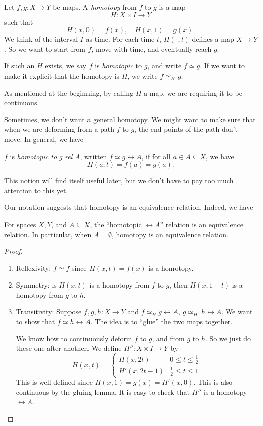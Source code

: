\documentclass[a4paper]{article}
\begin{document}
\begin{defi}[Homotopy]
  Let $f, g: X\to Y$ be maps. A \emph{homotopy} from $f$ to $g$ is a map
  \[
    H: X\times I \to Y
  \]
  such that
  \[
    H(x, 0) = f(x),\quad H(x, 1) = g(x).
  \]
  We think of the interval $I$ as time. For each time $t$, $H(\cdot, t)$ defines a map $X\to Y$. So we want to start from $f$, move with time, and eventually reach $g$.

  If such an $H$ exists, we say $f$ is \emph{homotopic} to $g$, and write $f\simeq g$. If we want to make it explicit that the homotopy is $H$, we write $f \simeq_H g$.
\end{defi}
As mentioned at the beginning, by calling $H$ a map, we are requiring it to be continuous.

Sometimes, we don't want a general homotopy. We might want to make sure that when we are deforming from a path $f$ to $g$, the end points of the path don't move. In general, we have
\begin{defi}
  $f$ is \emph{homotopic to} $g$ \emph{rel} $A$, written $f\simeq g\rel A$, if for all $a \in A\subseteq X$, we have
  \[
    H(a, t) = f(a) = g(a).
  \]
\end{defi}
This notion will find itself useful later, but we don't have to pay too much attention to this yet.

Our notation suggests that homotopy is an equivalence relation. Indeed, we have
\begin{prop}
  For spaces $X, Y$, and $A\subseteq X$, the ``homotopic $\rel A$'' relation is an equivalence relation. In particular, when $A = \emptyset$, homotopy is an equivalence relation.
\end{prop}

\begin{proof}\leavevmode
  \begin{enumerate}
    \item Reflexivity: $f \simeq f$ since $H(x, t) = f(x)$ is a homotopy.
    \item Symmetry: is $H(x, t)$ is a homotopy from $f$ to $g$, then $H(x, 1 - t)$ is a homotopy from $g$ to $h$.
    \item Transitivity: Suppose $f, g, h: X\to Y$ and $f\simeq_H g\rel A$, $g\simeq_{H'} h \rel A$. We want to show that $f\simeq h \rel A$. The idea is to ``glue'' the two maps together.

      We know how to continuously deform $f$ to $g$, and from $g$ to $h$. So we just do these one after another.
      We define $H'': X\times I \to Y$ by
      \[
        H(x, t) =
        \begin{cases}
          H(x, 2t) & 0 \leq t \leq \frac{1}{2}\\
          H'(x, 2t - 1) & \frac{1}{2} \leq t \leq 1
        \end{cases}
      \]
      This is well-defined since $H(x, 1) = g(x) = H'(x, 0)$. This is also continuous by the gluing lemma. It is easy to check that $H''$ is a homotopy $\rel A$.
  \end{enumerate}
\end{proof}
\end{document}
